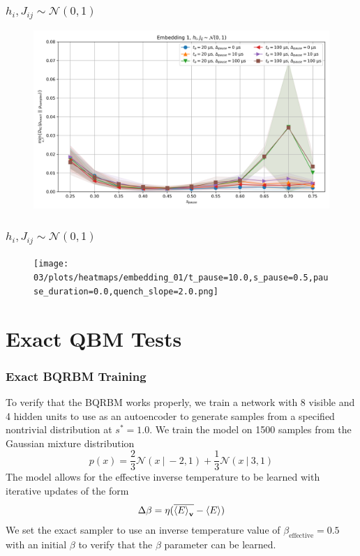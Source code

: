 \documentclass{beamer}
\begin{document}
\begin{frame}
    \frametitle{\( h_i, J_{ij} \sim \mathcal{N}(0, 1) \)}
    \begin{figure}
        \includegraphics[width=1\linewidth]{8x4/exact_analysis/03/embedding_01/kl_divergence_mins.png}
    \end{figure}
\end{frame}
\begin{frame}
    \frametitle{\( h_i, J_{ij} \sim \mathcal{N}(0, 1) \)}
    \begin{figure}
        \texttt{[image: 03/plots/heatmaps/embedding\_01/t\_pause=10.0,s\_pause=0.5,pause\_duration=0.0,quench\_slope=2.0.png]}
    \end{figure}
\end{frame}


\section{Exact QBM Tests}
\begin{frame}
    \frametitle{Exact BQRBM Training}
    To verify that the BQRBM works properly, we train a network with 8 visible and 4 hidden units to use as an autoencoder to generate samples from a specified nontrivial distribution at \( s^* = 1.0 \).
    We train the model on 1500 samples from the Gaussian mixture distribution
    \[
        p(x) = \frac{2}{3} \mathcal{N}(x \ | \ -2, 1) + \frac{1}{3} \mathcal{N}(x \ | \ 3, 1)
    \]
    The model allows for the effective inverse temperature to be learned with iterative updates of the form
    \[
        \Delta\beta = \eta (\overline{\braket{E}_{\mathbf{v}}} - \braket{E})
    \]
    We set the exact sampler to use an inverse temperature value of \( \beta_{\text{effective}} = 0.5 \) with an initial \( \beta \) to verify that the \( \beta \) parameter can be learned.
\end{frame}
\end{document}
